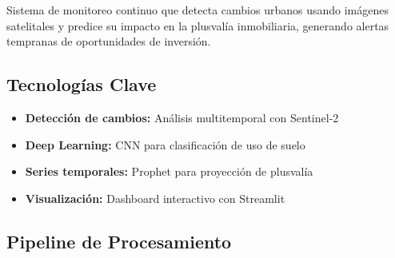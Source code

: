 \documentclass[12pt,a4paper]{article}
\begin{document}
Sistema de monitoreo continuo que detecta cambios urbanos usando imágenes satelitales y predice su impacto en la plusvalía inmobiliaria, generando alertas tempranas de oportunidades de inversión.

\subsection{Tecnologías Clave}

\begin{itemize}
    \item \textbf{Detección de cambios:} Análisis multitemporal con Sentinel-2
    \item \textbf{Deep Learning:} CNN para clasificación de uso de suelo
    \item \textbf{Series temporales:} Prophet para proyección de plusvalía
    \item \textbf{Visualización:} Dashboard interactivo con Streamlit
\end{itemize}

\subsection{Pipeline de Procesamiento}
\end{document}
